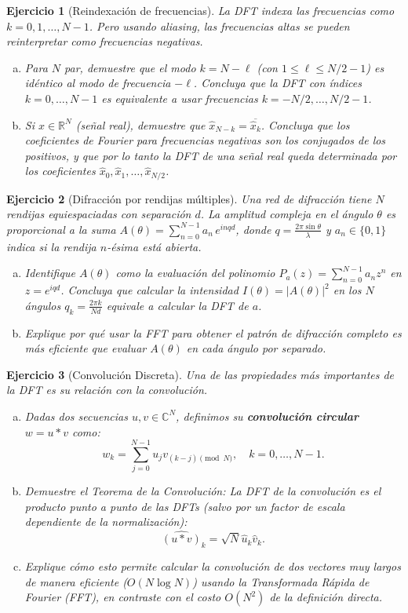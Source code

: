 \documentclass[12pt]{article}
\newtheorem{exercise}{Ejercicio}
\begin{document}
\begin{exercise}[Reindexación de frecuencias]
La DFT indexa las frecuencias como $k = 0, 1, \ldots, N-1$. Pero usando aliasing, las frecuencias altas se pueden reinterpretar como frecuencias negativas.
\begin{enumerate}[(a)]
\item Para $N$ par, demuestre que el modo $k = N - \ell$ (con $1 \leq \ell \leq N/2-1$) es idéntico al modo de frecuencia $-\ell$. Concluya que la DFT con índices $k = 0, \ldots, N-1$ es equivalente a usar frecuencias $k = -N/2, \ldots, N/2 - 1$.
\item Si $x \in \mathbb{R}^N$ (señal real), demuestre que $\hat{x}_{N-k} = \overline{\hat{x}_k}$. Concluya que los coeficientes de Fourier para frecuencias negativas son los conjugados de los positivos, y que por lo tanto la DFT de una señal real queda determinada por los coeficientes $\hat{x}_0, \hat{x}_1, \ldots, \hat{x}_{N/2}$.
\end{enumerate}
\end{exercise}

\begin{exercise}[Difracción por rendijas múltiples]
Una red de difracción tiene $N$ rendijas equiespaciadas con separación $d$. La amplitud compleja en el ángulo $\theta$ es proporcional a la suma $A(\theta) = \sum_{n=0}^{N-1} a_n\, e^{i n q d}$, donde $q = \frac{2\pi \sin\theta}{\lambda}$ y $a_n \in \{0, 1\}$ indica si la rendija $n$-ésima está abierta.
\begin{enumerate}[(a)]
\item Identifique $A(\theta)$ como la evaluación del polinomio $P_a(z) = \sum_{n=0}^{N-1} a_n z^n$ en $z = e^{iqd}$. Concluya que calcular la intensidad $I(\theta) = |A(\theta)|^2$ en los $N$ ángulos $q_k = \frac{2\pi k}{Nd}$ equivale a calcular la DFT de $a$.
\item Explique por qué usar la FFT para obtener el patrón de difracción completo es más eficiente que evaluar $A(\theta)$ en cada ángulo por separado.
\end{enumerate}
\end{exercise}

\begin{exercise}[Convolución Discreta]
Una de las propiedades más importantes de la DFT es su relación con la convolución.
\begin{enumerate}[(a)]
\item Dadas dos secuencias $u, v \in \mathbb{C}^N$, definimos su \textbf{convolución circular} $w = u * v$ como:
\[
w_k = \sum_{j=0}^{N-1} u_j v_{(k-j) \pmod N}, \quad k=0, \ldots, N-1.
\]
\item Demuestre el Teorema de la Convolución: La DFT de la convolución es el producto punto a punto de las DFTs (salvo por un factor de escala dependiente de la normalización):
\[
\widehat{(u * v)}_k = \sqrt{N} \hat{u}_k \hat{v}_k.
\]
\item Explique cómo esto permite calcular la convolución de dos vectores muy largos de manera eficiente ($O(N \log N)$) usando la Transformada Rápida de Fourier (FFT), en contraste con el costo $O(N^2)$ de la definición directa.
\end{enumerate}
\end{exercise}
\end{document}
